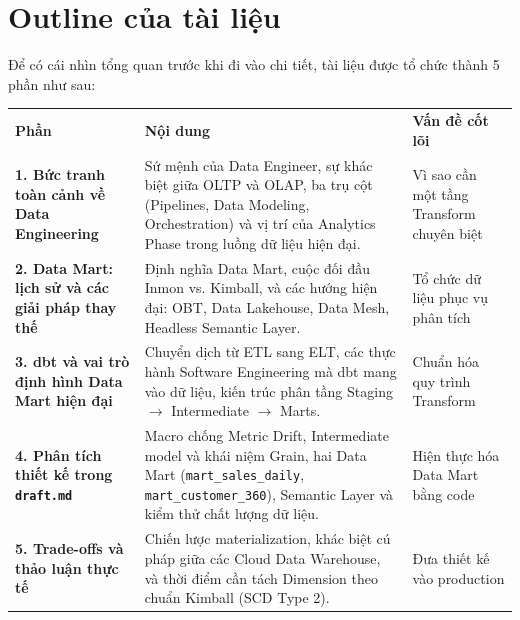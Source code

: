 \documentclass[12pt]{article}
\begin{document}
\section{Outline của tài liệu}

Để có cái nhìn tổng quan trước khi đi vào chi tiết, tài liệu được tổ chức thành 5 phần như sau:

\noindent
\begin{longtable}{@{}>{\RaggedRight\arraybackslash}p{3.1cm}>{\RaggedRight\arraybackslash}p{8.3cm}>{\RaggedRight\arraybackslash}p{4.3cm}@{}}
\rowcolor{rowLavender}
\textbf{Phần} & \textbf{Nội dung} & \textbf{Vấn đề cốt lõi} \\
\addlinespace[3pt]
\endhead

\textbf{1. Bức tranh toàn cảnh về Data Engineering}
& Sứ mệnh của Data Engineer, sự khác biệt giữa OLTP và OLAP, ba trụ cột (Pipelines, Data Modeling, Orchestration) và vị trí của Analytics Phase trong luồng dữ liệu hiện đại.
& Vì sao cần một tầng Transform chuyên biệt \\
\addlinespace[6pt]

\textbf{2. Data Mart: lịch sử và các giải pháp thay thế}
& Định nghĩa Data Mart, cuộc đối đầu Inmon vs. Kimball, và các hướng hiện đại: OBT, Data Lakehouse, Data Mesh, Headless Semantic Layer.
& Tổ chức dữ liệu phục vụ phân tích \\
\addlinespace[6pt]

\textbf{3. dbt và vai trò định hình Data Mart hiện đại}
& Chuyển dịch từ ETL sang ELT, các thực hành Software Engineering mà dbt mang vào dữ liệu, kiến trúc phân tầng Staging $\rightarrow$ Intermediate $\rightarrow$ Marts.
& Chuẩn hóa quy trình Transform \\
\addlinespace[6pt]

\textbf{4. Phân tích thiết kế trong \texttt{draft.md}}
& Macro chống Metric Drift, Intermediate model và khái niệm Grain, hai Data Mart (\texttt{mart\_sales\_daily}, \texttt{mart\_customer\_360}), Semantic Layer và kiểm thử chất lượng dữ liệu.
& Hiện thực hóa Data Mart bằng code \\
\addlinespace[6pt]

\textbf{5. Trade-offs và thảo luận thực tế}
& Chiến lược materialization, khác biệt cú pháp giữa các Cloud Data Warehouse, và thời điểm cần tách Dimension theo chuẩn Kimball (SCD Type 2).
& Đưa thiết kế vào production \\
\end{longtable}
\end{document}
